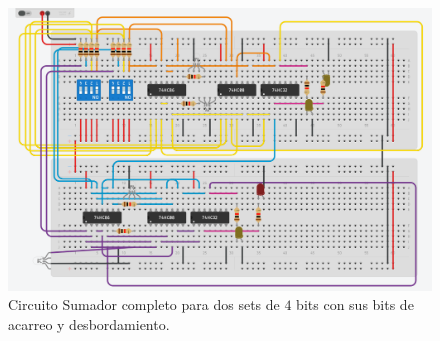\begin{figure}[H]
	\centering
	\includegraphics[scale=0.25]{Images/Parte1SC2.png}
	\caption{Circuito Sumador completo para dos sets de $4$ bits con sus bits de acarreo y desbordamiento.}
	\label{p1sc2}
\end{figure}
























